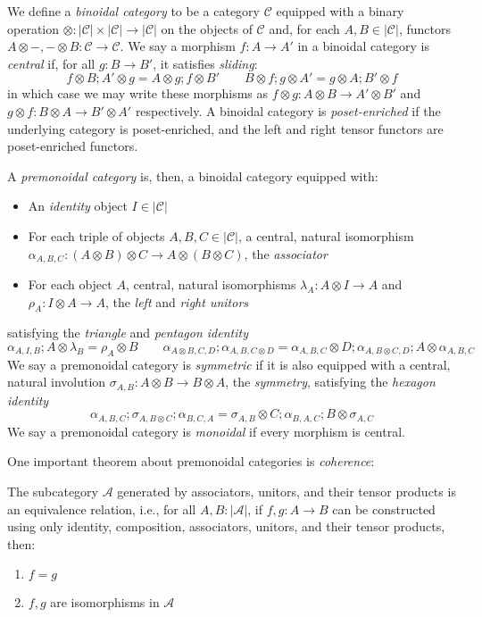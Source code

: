 \documentclass[acmsmall,screen,review]{acmart}
\newcommand{\mc}[1]{\ensuremath{\mathcal{#1}}}
\begin{document}
\begin{definition}
  We define a \emph{binoidal category} to be a category $\mc{C}$ equipped with a binary operation
  $\otimes : |\mc{C}| \times |\mc{C}| \to |\mc{C}|$ on the objects of $\mc{C}$ and, for each $A, B
  \in |\mc{C}|$, functors $A \otimes -, - \otimes B : \mc{C} \to \mc{C}$. We say a morphism $f : A
  \to A'$ in a binoidal category is \emph{central} if, for all $g : B \to B'$, it satisfies
  \emph{sliding}:
  $$
  f \otimes B ; A' \otimes g = A \otimes g ; f \otimes B' \qquad
  B \otimes f ; g \otimes A' = g \otimes A ; B' \otimes f
  $$
  in which case we may write these morphisms as $f \otimes g : A \otimes B \to A' \otimes B'$ and $g
  \otimes f : B \otimes A \to B' \otimes A'$ respectively. A binoidal category is
  \emph{poset-enriched} if the underlying category is poset-enriched, and the left and right tensor
  functors are poset-enriched functors.
  
  A \emph{premonoidal category} is, then, a
  binoidal category equipped with:
  \begin{itemize}
    \item An \emph{identity} object $I \in |\mc{C}|$
    \item For each triple of objects $A, B, C \in |\mc{C}|$, a central, natural isomorphism
    $\alpha_{A, B, C} : (A \otimes B) \otimes C \to A \otimes (B \otimes C)$, the \emph{associator}
    \item For each object $A$, central, natural isomorphisms $\lambda_A : A \otimes I \to A$ and
    $\rho_A : I \otimes A \to A$, the \emph{left} and \emph{right unitors}
  \end{itemize}
  satisfying the \emph{triangle} and \emph{pentagon identity}
  $$
  \alpha_{A, I, B} ; A \otimes \lambda_B = \rho_A \otimes B \qquad
  \alpha_{A \otimes B, C, D} ; \alpha_{A, B, C \otimes D}
  = \alpha_{A, B, C} \otimes D ; \alpha_{A, B \otimes C, D} ; A \otimes \alpha_{A, B, C}
  $$
  We say a premonoidal category is \emph{symmetric} if it is also equipped with a central, natural
  involution $\sigma_{A, B} : A \otimes B \to B \otimes A$, the \textit{symmetry}, satisfying the
  \emph{hexagon identity}
  $$
  \alpha_{A, B, C} ; \sigma_{A, B \otimes C} ; \alpha_{B, C, A}
  = \sigma_{A, B} \otimes C ; \alpha_{B, A, C} ; B \otimes \sigma_{A, C}
  $$
  We say a premonoidal category is \emph{monoidal} if every morphism is central.
\end{definition}
One important theorem about premonoidal categories is \emph{coherence}:
\begin{theorem}
  The subcategory $\mc{A}$ generated by associators, unitors, and their tensor products is an
  equivalence relation, i.e., for all $A, B : |\mc{A}|$, if
  $f, g : A \to B$ can be constructed using only identity, composition, associators, unitors, and
  their tensor products, then:
  \begin{enumerate}[label=(\alph*)]
    \item $f = g$
    \item $f, g$ are isomorphisms in $\mc{A}$
  \end{enumerate}
  \label{thm:monoidal-coherence}
\end{theorem}
\end{document}
